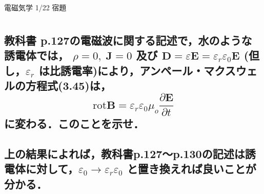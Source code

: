 \documentclass[a4paper, 11pt]{bxjsarticle}
\begin{document}
\begin{samepage}

\begin{center}
    \begin{huge}
        電磁気学 1/22 宿題
    \end{huge}
\end{center}

\section{}
\subsection{教科書 p.127の電磁波に関する記述で，水のような誘電体では，%
\(\rho = 0,\;\boldsymbol{J} = 0\) 及び  \(\boldsymbol{D}=\varepsilon  \boldsymbol{E} =\varepsilon _r \varepsilon _0 \boldsymbol{E}\)%
 (但し，\(\varepsilon _r\) は比誘電率)により，アンペール・マクスウェルの方程式(3.45)は，
\[\mathrm{rot} \boldsymbol{B} = \varepsilon _r \varepsilon _0 \mu_o \frac{\partial \boldsymbol{E}}{\partial t}\]に変わる．このことを示せ．}
\vspace*{20em}
\subsection{上の結果によれば，教科書p.127〜p.130の記述は誘電体に対して，\(\varepsilon _0 \rightarrow \varepsilon_r \varepsilon_0\) と置き換えれば良いことが分かる．}
\end{samepage}
\newpage
\end{document}

